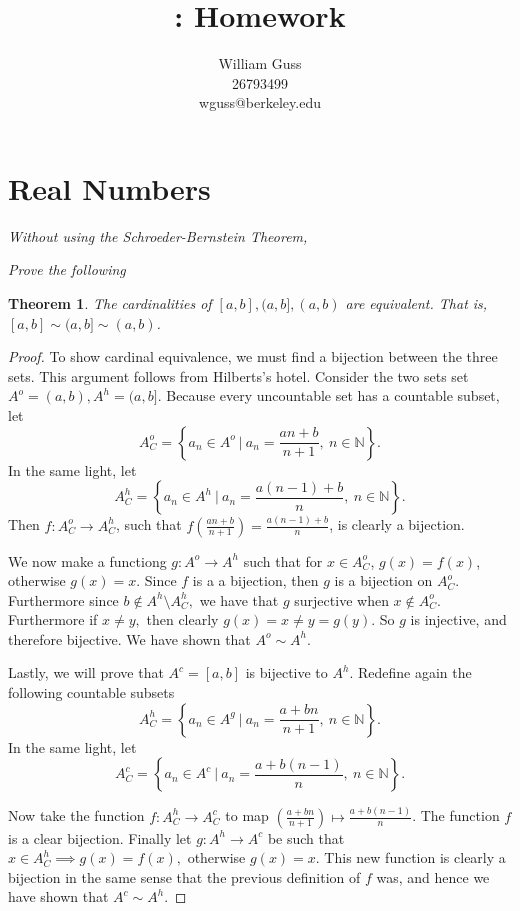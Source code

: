 \documentclass[letter]{article}
\title{\bCLASS: Homework \bHWN}
\author{William Guss\\26793499\\wguss@berkeley.edu}
\newtheorem{theorem}{Theorem}
\newenvironment{menumerate}{%
  \edef\backupindent{\the\parindent}%
  \enumerate%
  \setlength{\parindent}{\backupindent}%
}{\endenumerate}
\begin{document}
\maketitle
\thispagestyle{empty}


\section{Real Numbers}
\begin{menumerate}
	\setcounter{enumi}{35}
	\item \textit{Without using the Schroeder-Bernstein Theorem,}
		\begin{menumerate}
		 	\item \textit{Prove the following}
		 		\begin{theorem}
		 			The cardinalities of $[a,b], (a,b], (a,b)$ are equivalent.
		 			 That is, $[a,b]\sim (a,b]\sim (a,b)$.
	 			 \end{theorem}
	 			 \begin{proof}
	 			 	To show cardinal equivalence, we must find a bijection between the three sets. This argument follows from Hilberts's hotel. Consider the two sets set $A^o = (a,b), A^h = (a,b].$ Because every uncountable set has a countable subset, let $$A^o_C = \left\{a_n \in A^o\  | \ a_n = \frac{an +b}{n+1} ,\  n \in \mathbb{N} \right\}.$$
	 			 	In the same light, let $$A^h_C = \left\{a_n \in A^h\  |\ a_n = \frac{a(n-1) +b}{n} ,\   n \in \mathbb{N} \right\}.$$
	 			 	Then $f: A^o_C \to A^h_C $, such that $f(\frac{an +b}{n+1}) = \frac{a(n-1) +b}{n}$, is clearly a bijection.

	 			 	We now make a functiong $g: A^o \to   A^h$ such that for $x \in A^o_C$, $g(x) = f(x)$, otherwise $g(x) = x.$ Since $f$ is a a bijection, then $g$ is a bijection on $A^o_C$. Furthermore since $b \notin A^h \setminus A^h_C,$ we have that $g$ surjective when $x \notin A^o_C.$ Furthermore if $x \neq y,$ then clearly $g(x) = x \neq y = g(y).$ So $g$ is injective, and therefore bijective. We have shown that $A^o \sim A^h.$

	 			 	Lastly, we will prove that $A^c = [a,b]$ is bijective to $A^h.$ Redefine again the following countable subsets
	 			 	$$A^h_C = \left\{a_n \in A^g\  | \ a_n = \frac{a +bn}{n+1} ,\  n \in \mathbb{N} \right\}.$$
	 			 	In the same light, let $$A^c_C = \left\{a_n \in A^c\  |\ a_n = \frac{a +b(n-1)}{n} ,\   n \in \mathbb{N} \right\}.$$

	 			 	Now take the function $f:A^h_C \to A^c_C$ to map $(\frac{a +bn}{n+1}) \mapsto \frac{a +b(n-1)}{n}$. The function $f$ is a clear bijection. Finally let $g: A^h \to A^c$ be such that $x \in A^h_C \implies g(x) = f(x),$ otherwise $g(x) = x$. This new function is clearly a bijection in the same sense that the previous definition of $f$ was, and hence we have shown that $A^c \sim A^h$.


\end{proof}
\end{menumerate}
\end{menumerate}
\end{document}
